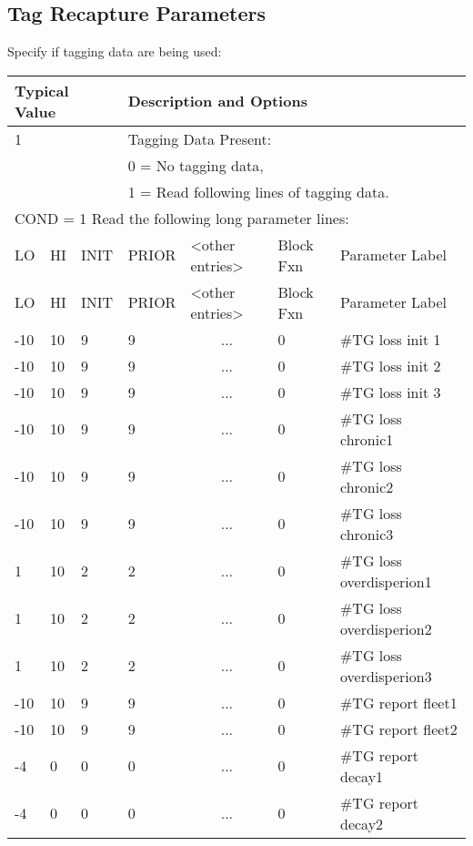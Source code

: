 \subsection{Tag Recapture Parameters}
Specify if tagging data are being used:


\begin{longtable}{p{1cm} p{1cm} p{1cm}  p{1.5cm}  p{2.9cm}  p{1.5cm}  p{4.5cm} }
	\hline
	\multicolumn{3}{l}{Typical Value} &  \multicolumn{4}{l}{Description and Options}\Tstrut\Bstrut\\
	\hline
	\multicolumn{3}{l}{1} &  \multicolumn{4}{l}{Tagging Data Present:} \Tstrut\\
	\multicolumn{3}{l}{}  &  \multicolumn{4}{l}{0 = No tagging data,} \\
	\multicolumn{3}{l}{}  &  \multicolumn{4}{l}{1 = Read following lines of tagging data.} \Bstrut\\


	\multicolumn{7}{l}{COND = 1 Read the following long parameter lines:}\Tstrut\\
	\hline
	LO \Tstrut & HI & INIT & PRIOR &  <other entries> & Block Fxn & Parameter Label\Bstrut\\
	\hline
	\endfirsthead

	\hline
	LO \Tstrut & HI & INIT & PRIOR & <other entries> & Block Fxn & Parameter Label\Bstrut\\
	\hline
	\endhead

	\hline
	\endfoot
	\endlastfoot

	-10 & 10 & 9 & 9 & \multicolumn{1}{c}{...} & 0 & \#TG loss init 1\Tstrut\\
	-10 & 10 & 9 & 9 & \multicolumn{1}{c}{...} & 0 & \#TG loss init 2\\
	-10 & 10 & 9 & 9 & \multicolumn{1}{c}{...} & 0 & \#TG loss init 3\\
	-10 & 10 & 9 & 9 & \multicolumn{1}{c}{...} & 0 & \#TG loss chronic1\\
	-10 & 10 & 9 & 9 & \multicolumn{1}{c}{...} & 0 & \#TG loss chronic2\\
	-10 & 10 & 9 & 9 & \multicolumn{1}{c}{...} & 0 & \#TG loss chronic3\\
	  1 & 10 & 2 & 2 & \multicolumn{1}{c}{...} & 0 & \#TG loss overdisperion1\\
	  1 & 10 & 2 & 2 & \multicolumn{1}{c}{...} & 0 & \#TG loss overdisperion2\\
	  1 & 10 & 2 & 2 & \multicolumn{1}{c}{...} & 0 & \#TG loss overdisperion3\\
	-10 & 10 & 9 & 9 & \multicolumn{1}{c}{...} & 0 & \#TG report fleet1\\
	-10 & 10 & 9 & 9 & \multicolumn{1}{c}{...} & 0 & \#TG report fleet2\\
	 -4 &  0 & 0 & 0 & \multicolumn{1}{c}{...} & 0 & \#TG report decay1\\
	 -4 &  0 & 0 & 0 & \multicolumn{1}{c}{...} & 0 & \#TG report decay2\Bstrut\\
	 \hline
\end{longtable}

